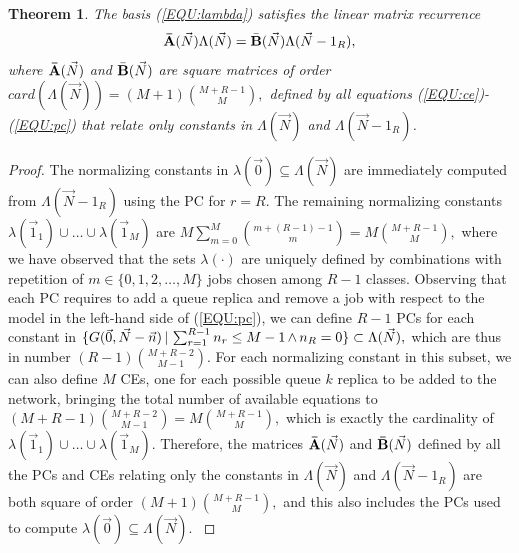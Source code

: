\documentclass[journal,twocolumn,9.5pt]{IEEEtran}
\newtheorem{theorem}{Theorem}
\newcommand{\comom}[1]{\bar{#1}}
\begin{document}
\begin{theorem}{\em
\label{THM:CoMoM}
The basis (\ref{EQU:lambda}) satisfies the linear matrix recurrence
\begin{equation}
\label{EQU:comom0}
{\bf \comom{A}}(\vec N){\Lambda}(\vec N)=\comom{\bf B}(\vec N){\Lambda}(\vec N-1_R),
\end{equation}
where ${\bf \comom{A}}(\vec N)$ and $\comom{\bf B}(\vec N)$ are square matrices of order
$\textstyle card(\Lambda(\vec N))=(M+1){M+R-1\choose M},$
defined by all equations (\ref{EQU:ce})-(\ref{EQU:pc}) that relate only
constants in ${\Lambda}(\vec N)$ and ${\Lambda}(\vec N-1_R)$.}
\end{theorem}
\begin{proof}
{\rm
The normalizing constants in ${\lambda}(\vec 0) \subseteq {\Lambda}(\vec N)$ are immediately computed from ${\Lambda}(\vec N-1_R)$ using the
PC for $r=R$. The remaining normalizing constants $\lambda(\vec 1_1)\cup \ldots \cup \lambda(\vec 1_M)$ are
$M\sum_{m=0}^M {m+(R-1)-1\choose m}=M{M+R-1\choose M},$
where we have observed that the sets $\lambda(\cdot)$ are uniquely defined by combinations with repetition of $m\in\{0,1,2,\ldots,M\}$ jobs chosen among $R-1$ classes. Observing that each PC requires to add a queue replica and remove a job with respect to the model in the left-hand side of (\ref{EQU:pc}), we can define $R-1$ PCs for each constant in $\{G( \vec 0,\vec N- \vec n)\,|\, \textstyle \sum_{r=1}^{R-1} n_r\leq M-1 {\,\rm \wedge\,} n_R=0\}\subset \Lambda(\vec N),$ which are thus in number
$(R-1){M+R-2\choose M-1}.$ For each normalizing constant in this subset, we can also define $M$ CEs, one for each possible queue $k$ replica to be added to the network, bringing the total number of available equations to
$(M+R-1){M+R-2\choose M-1}=M{M+R-1\choose M},$
which is exactly the cardinality of $\lambda(\vec 1_1)\cup \ldots \cup \lambda(\vec 1_M)$. Therefore, the matrices ${\bf \comom{A}}(\vec N)$ and ${\bf \comom{B}}(\vec N)$ defined by all the PCs and CEs relating only the constants in ${\Lambda}(\vec N)$ and ${\Lambda}(\vec N-1_R)$ are  both square of order $(M+1){M+R-1\choose M},$
and this also includes the PCs used to compute ${\lambda}(\vec 0) \subseteq {\Lambda}(\vec N)$.
}
\end{proof}
\end{document}
